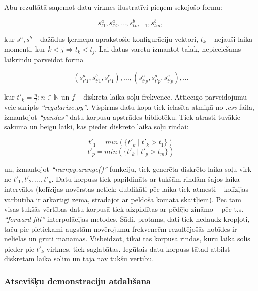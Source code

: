 \documentclass[12pt, a4paper]{article}
\numberwithin{equation}{section} %
\begin{document}
Abu rezultātā saņemot datu virknes ilustratīvi pieņem sekojošo formu:


\begin{equation}
    s^a_{t1}, s^a_{t2}, ..., s^b_{tm-1}, s^b_{tm},
\end{equation}

kur $s^a, s^b$ -- dažādus ķermeņu aprakstošie konfigurāciju vektori, $t_k$ -- nejauši laika momenti, kur $k < j \Rightarrow t_k < t_j$. Lai datus varētu izmantot tālāk, nepieciešams laikrindu pārveidot formā

\begin{equation}
    (s^a_{t'1}, s^b_{t'1}, s^c_{t'1}), ..., (s^a_{t'p}, s^a_{t'p}, s^c_{t'p}), ...
\end{equation}

kur $t'_k = \frac{n}{f}: n \in \mathbb{N}$ un $f$ -- diskrētā laika soļu frekvence. Attiecīgo pārveidojumu veic skripts \textit{``regularize.py''}. Vispirms datu kopa tiek ielasīta atmiņā no \textit{.csv} faila, izmantojot \textit{``pandas''} datu korpusu apstrādes bibliotēku. Tiek atrasti tuvākie sākuma un beigu laiki, kas pieder diskrēto laika soļu rindai:

\begin{equation}
    t'_1 = min(\lbrace t'_k \mid t'_k > t_1 \rbrace)
\end{equation}
\begin{equation}
    t'_p = min(\lbrace t'_k \mid t'_p > t_m \rbrace)
\end{equation}

un, izmantojot \textit{``numpy.arange()''} funkciju, tiek ģenerēta diskrēto laika soļu virk-ne $t'_1, t'_2, ..., t'_p$. Datu korpuss tiek papildināts ar tukšām rindām šajos laika intervālos (kolīzijas novērstas netiek; dublikāti pēc laika tiek atmesti -- kolīzijas varbūtība ir ārkārtīgi zema, strādājot ar peldošā komata skaitļiem). Pēc tam visas tukšās vērtības datu korpusā tiek aizpildītas ar pēdējo zināmo -- pēc t.s. \textit{``forward fill''} interpolācijas metodes. Šādi, protams, dati tiek nedaudz kropļoti, taču pie pietiekami augstām novērojumu frekvencēm rezultējošās nobīdes ir nelielas un grūti manāmas. Visbeidzot, tikai tās korpusa rindas, kuru laika solis pieder pie $t'_k$ virknes, tiek saglabātas. Iegūtais datu korpuss tātad atbilst diskrētam laika solim un tajā nav tukšu vērtību.

\subsubsection{Atsevišķu demonstrāciju atdalīšana}
\end{document}
